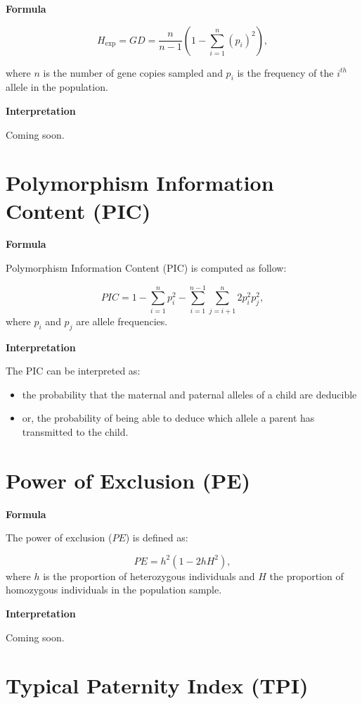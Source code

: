 \documentclass[
]{book}
\begin{document}
\textbf{Formula}

\[
  H_{\mathrm{exp}} = GD = \frac{n}{n - 1} \left( 1 - \sum_{i=1}^{n}(p_i)^2 \right),
\]

where \(n\) is the number of gene copies sampled and \(p_i\) is the
frequency of the \(i^{th}\) allele in the population.

\textbf{Interpretation}

Coming soon.

\hypertarget{polymorphism-information-content-pic}{%
\section{Polymorphism Information Content (PIC)}\label{polymorphism-information-content-pic}}

\textbf{Formula}

Polymorphism Information Content (PIC) is computed as follow:

\[
PIC = 1 - \sum_{i=1}^{n} p_i^2 - \sum_{i=1}^{n-1} \sum_{j=i+1}^{n} 2p_i^2p_j^2,
\]
where \(p_i\) and \(p_j\) are allele frequencies.

\textbf{Interpretation}

The PIC can be interpreted as:

\begin{itemize}
\item
  the probability that the maternal and paternal alleles of a child are
  deducible
\item
  or, the probability of being able to deduce which allele a
  parent has transmitted to the child.
\end{itemize}

\hypertarget{power-of-exclusion-pe}{%
\section{Power of Exclusion (PE)}\label{power-of-exclusion-pe}}

\textbf{Formula}

The power of exclusion (\(PE\)) is defined as:

\[
PE = h^2\left(1 - 2hH^2\right),
\]
where \(h\) is the proportion of heterozygous individuals and \(H\) the
proportion of homozygous individuals in the population sample.

\textbf{Interpretation}

Coming soon.

\hypertarget{typical-paternity-index-tpi}{%
\section{Typical Paternity Index (TPI)}\label{typical-paternity-index-tpi}}
\end{document}
